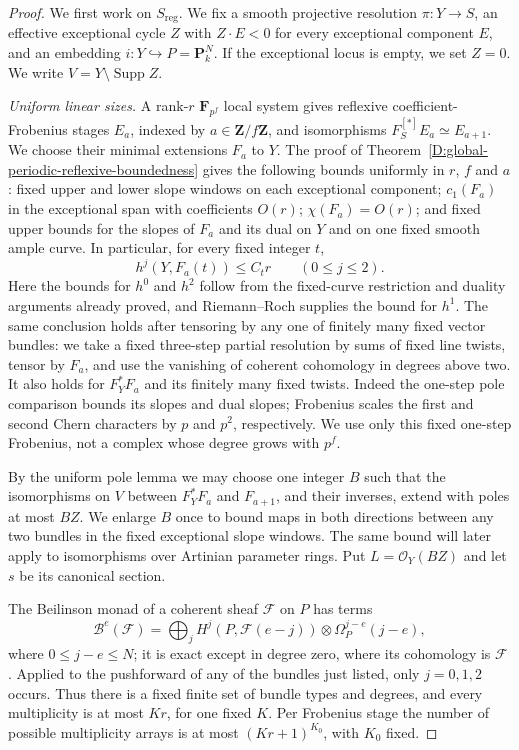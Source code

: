 \begin{proof}
We first work on $S_{\mathrm{reg}}$. We fix a smooth projective resolution
$\pi:Y\to S$, an effective exceptional cycle $Z$ with $Z\cdot E<0$ for
every exceptional component $E$, and an embedding
$i:Y\hookrightarrow P=\mathbf P^N_k$. If the exceptional locus is empty,
we set $Z=0$. We write $V=Y\setminus\operatorname{Supp}Z$.

\emph{Uniform linear sizes.}
A rank-$r$ $\mathbf F_{p^f}$ local system gives reflexive
coefficient-Frobenius stages $E_a$, indexed by
$a\in\mathbf Z/f\mathbf Z$, and isomorphisms
$F_S^{[*]}E_a\simeq E_{a+1}$. We choose their minimal extensions
$F_a$ to $Y$. The proof of
Theorem~\ref{D:global-periodic-reflexive-boundedness} gives the following
bounds uniformly in $r$, $f$ and $a$: fixed upper and lower slope windows
on each exceptional component; $c_1(F_a)$ in the exceptional span with
coefficients $O(r)$; $\chi(F_a)=O(r)$; and fixed upper bounds for the
slopes of $F_a$ and its dual on $Y$ and on one fixed smooth ample curve.
In particular, for every fixed integer $t$,
\[
 h^j(Y,F_a(t))\le C_tr\qquad(0\le j\le2).
\]
Here the bounds for $h^0$ and $h^2$ follow from the fixed-curve restriction
and duality arguments already proved, and Riemann--Roch supplies the bound
for $h^1$. The same conclusion holds after tensoring by any one of
finitely many fixed vector bundles: we take a fixed three-step partial
resolution by sums of fixed line twists, tensor by $F_a$, and use the
vanishing of coherent cohomology in degrees above two. It also holds for
$F_Y^*F_a$ and its finitely many fixed twists. Indeed the one-step pole
comparison bounds its slopes and dual slopes; Frobenius scales the first
and second Chern characters by $p$ and $p^2$, respectively. We use only
this fixed one-step Frobenius, not a complex whose degree grows with $p^f$.

By the uniform pole lemma we may choose one integer $B$ such that the
isomorphisms on $V$ between $F_Y^*F_a$ and $F_{a+1}$, and their inverses,
extend with poles at most $BZ$. We enlarge $B$ once to bound maps in both
directions between any two bundles in the fixed exceptional slope windows.
The same bound will later apply to isomorphisms over Artinian parameter
rings. Put $L=\mathcal O_Y(BZ)$ and let $s$ be its canonical section.

The Beilinson monad of a coherent sheaf $\mathcal F$ on $P$ has terms
\[
 \mathcal B^e(\mathcal F)=
 \bigoplus_j H^j(P,\mathcal F(e-j))\otimes\Omega_P^{j-e}(j-e),
\]
where $0\le j-e\le N$; it is exact except in degree zero, where its
cohomology is $\mathcal F$
\citep[Theorem~6.1, pp.~23--25]{C_EFS2003}. Applied to the pushforward
of any of the bundles just listed, only $j=0,1,2$ occurs. Thus there is a
fixed finite set of bundle types and degrees, and every multiplicity is
at most $Kr$, for one fixed $K$. Per Frobenius stage the number of possible
multiplicity arrays is at most $(Kr+1)^{K_0}$, with $K_0$ fixed.


\end{proof}
